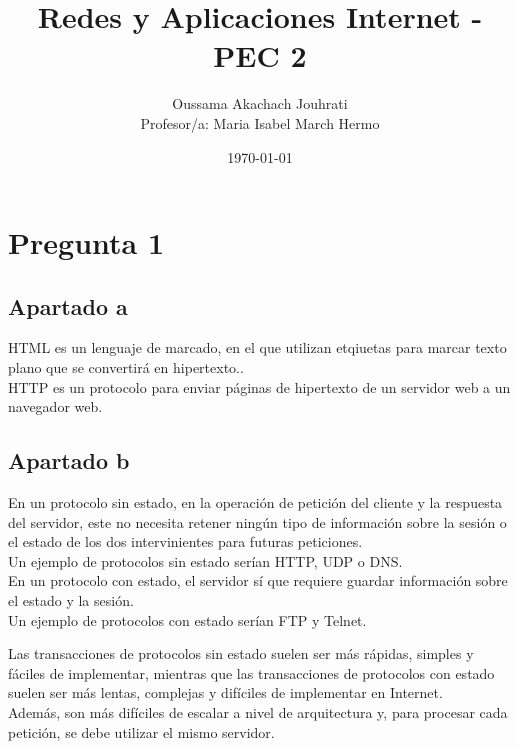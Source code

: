 \documentclass[spanish]{article}
\title{Redes y Aplicaciones Internet - PEC 2}
\author{Oussama Akachach Jouhrati\\
[0.5cm]{\small Profesor/a: Maria Isabel March Hermo}}
\date{\today}
\begin{document}
\maketitle
\newpage

\tableofcontents
{}
\setcounter{page}{2}
\newpage



\section{Pregunta 1}

\subsection{Apartado a}

HTML es un lenguaje de marcado, en el que utilizan etqiuetas
para marcar texto plano que se convertirá en hipertexto..\\

HTTP es un protocolo para enviar páginas de hipertexto de un
servidor web a un navegador web.

\subsection{Apartado b}

En un protocolo sin estado, en la operación de petición del
cliente y la respuesta del servidor, este no necesita
retener ningún tipo de información sobre la sesión o el
estado de los dos intervinientes para futuras peticiones.\\

Un ejemplo de protocolos sin estado serían HTTP, UDP o
DNS.\\

En un protocolo con estado, el servidor sí que requiere
guardar información sobre el estado y la sesión.\\

Un ejemplo de protocolos con estado serían FTP y Telnet.

Las transacciones de protocolos sin estado suelen ser más
rápidas, simples y fáciles de implementar, mientras que las
transacciones de protocolos con estado suelen ser más
lentas, complejas y difíciles de implementar en Internet.\\

Además, son más difíciles de escalar a nivel de arquitectura
y, para procesar cada petición, se debe utilizar el mismo
servidor.
\end{document}
